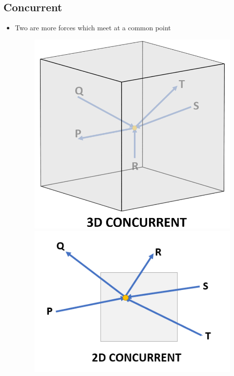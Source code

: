 \documentclass[8pt]{report}
\begin{document}
	\subsection{Concurrent}
		\begin{itemize}
			\item Two are more forces which meet at a common point
			\begin{figure}[H]
				\centering
				\includegraphics[scale=0.2]{3dconcurrent.png}
				\includegraphics[scale=0.4]{2dconcurrent.png}
			\end{figure}
		\end{itemize}
\end{document}

